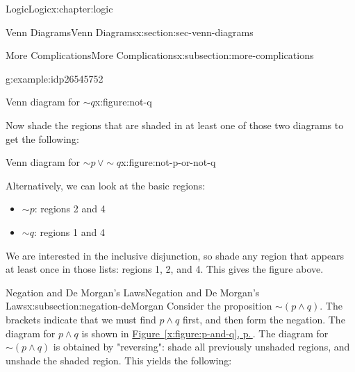 \documentclass[twoside,10pt,]{book}
\newcommand{\xreffont}{\relax}
\numberwithin{equation}{section}
\begin{document}
\begin{chapterptx}{Logic}{}{Logic}{}{}{x:chapter:logic}
\begin{sectionptx}{Venn Diagrams}{}{Venn Diagrams}{}{}{x:section:sec-venn-diagrams}
\begin{subsectionptx}{More Complications}{}{More Complications}{}{}{x:subsection:more-complications}
\begin{example}{}{g:example:idp26545752}
\par
\begin{figureptx}{Venn diagram for \(\sim\!{q}\)}{x:figure:not-q}{}%
\begin{image}{0.3}{0.4}{0.3}%
\resizebox{\linewidth}{!}{%
\begin{venndiagram2sets}[labelA={$p$},labelB={$q$}]
  \fillNotB
\end{venndiagram2sets}
}%
\end{image}%
\tcblower
\end{figureptx}%
%
\par
Now shade the regions that are shaded in at least one of those two diagrams to get the following:%
\par
\begin{figureptx}{Venn diagram for \(\sim\!{p}\,{\vee}\sim\!{q}\)}{x:figure:not-p-or-not-q}{}%
\begin{image}{0.3}{0.4}{0.3}%
\resizebox{\linewidth}{!}{%
\begin{venndiagram2sets}[labelA={$p$},labelB={$q$}]
  \fillNotAorNotB
\end{venndiagram2sets}
}%
\end{image}%
\tcblower
\end{figureptx}%
%
\par
Alternatively, we can look at the basic regions:%
\begin{itemize}[label=\textbullet]
\item{}\(\sim\!{p}\): regions 2 and 4%
\item{}\(\sim\!{q}\): regions 1 and 4%
\end{itemize}
We are interested in the inclusive disjunction, so shade any region that appears at least once in those lists: regions 1, 2, and 4.  This gives the figure above.%
\end{example}
\end{subsectionptx}
%
%
\typeout{************************************************}
\typeout{************************************************}
%
\begin{subsectionptx}{Negation and De Morgan's Laws}{}{Negation and De Morgan's Laws}{}{}{x:subsection:negation-deMorgan}
Consider the proposition \(\sim\!(p {\wedge} q)\).  The brackets indicate that we must find \(p {\wedge} q\) first, and then form the negation.  The diagram for \(p {\wedge} q\) is shown in \hyperref[x:figure:p-and-q]{Figure~{\xreffont\ref{x:figure:p-and-q}}, p.\,\pageref{x:figure:p-and-q}}.  The diagram for \(\sim\!(p {\wedge} q)\) is obtained by "reversing": shade all previously unshaded regions, and unshade the shaded region.  This yields the following:%

\end{subsectionptx}
\end{sectionptx}
\end{chapterptx}
\end{document}
